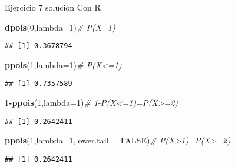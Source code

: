 \documentclass[
  ignorenonframetext,
]{beamer}
\newenvironment{Shaded}{\begin{snugshade}}{\end{snugshade}}
\newcommand{\CommentTok}[1]{\textcolor[rgb]{0.56,0.35,0.01}{\textit{#1}}}
\newcommand{\DataTypeTok}[1]{\textcolor[rgb]{0.13,0.29,0.53}{#1}}
\newcommand{\DecValTok}[1]{\textcolor[rgb]{0.00,0.00,0.81}{#1}}
\newcommand{\KeywordTok}[1]{\textcolor[rgb]{0.13,0.29,0.53}{\textbf{#1}}}
\newcommand{\NormalTok}[1]{#1}
\newcommand{\OperatorTok}[1]{\textcolor[rgb]{0.81,0.36,0.00}{\textbf{#1}}}
\newcommand{\OtherTok}[1]{\textcolor[rgb]{0.56,0.35,0.01}{#1}}
\begin{document}
\begin{frame}[fragile]{Ejercicio 7 solución}
\protect\hypertarget{ejercicio-7-soluciuxf3n-2}{}
Con R

\begin{Shaded}
\begin{Highlighting}[]
\KeywordTok{dpois}\NormalTok{(}\DecValTok{0}\NormalTok{,}\DataTypeTok{lambda=}\DecValTok{1}\NormalTok{)}\CommentTok{\# P(X=1)}
\end{Highlighting}
\end{Shaded}

\begin{verbatim}
## [1] 0.3678794
\end{verbatim}

\begin{Shaded}
\begin{Highlighting}[]
\KeywordTok{ppois}\NormalTok{(}\DecValTok{1}\NormalTok{,}\DataTypeTok{lambda=}\DecValTok{1}\NormalTok{)}\CommentTok{\# P(X\textless{}=1)}
\end{Highlighting}
\end{Shaded}

\begin{verbatim}
## [1] 0.7357589
\end{verbatim}

\begin{Shaded}
\begin{Highlighting}[]
\DecValTok{1}\OperatorTok{{-}}\KeywordTok{ppois}\NormalTok{(}\DecValTok{1}\NormalTok{,}\DataTypeTok{lambda=}\DecValTok{1}\NormalTok{)}\CommentTok{\# 1{-}P(X\textless{}=1)=P(X\textgreater{}=2)}
\end{Highlighting}
\end{Shaded}

\begin{verbatim}
## [1] 0.2642411
\end{verbatim}

\begin{Shaded}
\begin{Highlighting}[]
\KeywordTok{ppois}\NormalTok{(}\DecValTok{1}\NormalTok{,}\DataTypeTok{lambda=}\DecValTok{1}\NormalTok{,}\DataTypeTok{lower.tail =} \OtherTok{FALSE}\NormalTok{)}\CommentTok{\# P(X\textgreater{}1)=P(X\textgreater{}=2)}
\end{Highlighting}
\end{Shaded}

\begin{verbatim}
## [1] 0.2642411
\end{verbatim}
\end{frame}
\end{document}
